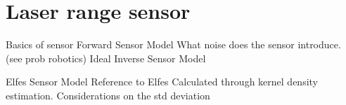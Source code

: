 \section{Laser range sensor}

Basics of sensor
Forward Sensor Model
What noise does the sensor introduce. (see prob robotics)
Ideal Inverse Sensor Model

Elfes Sensor Model
Reference to Elfes
Calculated through kernel density estimation. 
Considerations on the std deviation
